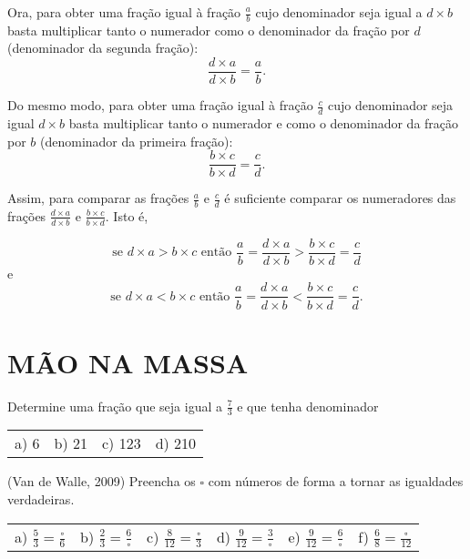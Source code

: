 Ora, para obter uma fração igual à fração $\frac{a}{b}$ cujo denominador seja igual a $d\times b$ basta multiplicar tanto o numerador como o denominador da fração por $d$ (denominador da segunda fração):
$$\dfrac{d\times a}{d \times b} =  \dfrac{a}{b}.$$

Do mesmo modo, para obter uma fração igual à fração $\frac{c}{d}$ cujo denominador seja igual $d\times b$ basta multiplicar tanto o numerador e como o denominador da fração por $b$ (denominador da primeira fração):
$$\dfrac{b\times c}{b \times d} =  \dfrac{c}{d}.$$

Assim, para comparar as frações $\frac{a}{b}$ e $\frac{c}{d}$ é suficiente comparar os numeradores das frações  $\frac{d\times a}{d \times b}$ e $\frac{b\times c}{b \times d}$.
Isto é,

$$\text{se } d\times a > b\times c \text{ então }  \dfrac{a}{b} = \dfrac{d\times a}{d \times b} >\dfrac{b\times c}{b \times d} =  \dfrac{c}{d}$$
e
$$\text{se } d\times a < b\times c \text{ então }  \dfrac{a}{b} = \dfrac{d\times a}{d \times b} < \dfrac{b\times c}{b \times d} =  \dfrac{c}{d}.$$


\section{MÃO NA MASSA }

\begin{atividade}{}

Determine uma fração que seja igual a $\frac{7}{3}$ e que tenha denominador

\begin{tabular}{m{}m{}m{}m{}}
 a) 6 & b) 21 & c) 123 & d) 210
\end{tabular}
\end{atividade}

\begin{atividade}{}

(Van de Walle, 2009)
Preencha os $\square$ com números de forma a tornar as igualdades verdadeiras.

\noindent\begin{tabular}{m{}m{}m{}m{}m{}m{}}
a)  $\frac{5}{3} = \frac{\square}{6}$ & b) $\frac{2}{3} = \frac{6}{\square}$ & c) $\frac{8}{12} = \frac{\square}{3}$ & d) $\frac{9}{12} = \frac{3}{\square}$& e) $\frac{9}{12} = \frac{6}{\square}$& f)  $\frac{6}{8} = \frac{\square}{12}$
\end{tabular}
\end{atividade}

